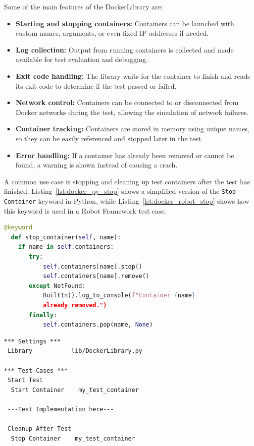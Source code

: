 \vspace{0.5em}
Some of the main features of the DockerLibrary are:

\begin{itemize}
	\item \textbf{Starting and stopping containers:} Containers can be launched with custom names, arguments, or even fixed IP addresses if needed.
	\item \textbf{Log collection:} Output from running containers is collected and made available for test evaluation and debugging.
	\item \textbf{Exit code handling:} The library waits for the container to finish and reads its exit code to determine if the test passed or failed.
	\item \textbf{Network control:} Containers can be connected to or disconnected from Docker networks during the test, allowing the simulation of network failures.
	\item \textbf{Container tracking:} Containers are stored in memory using unique names, so they can be easily referenced and stopped later in the test.
	\item \textbf{Error handling:} If a container has already been removed or cannot be found, a warning is shown instead of causing a crash.
\end{itemize}

\vspace{0.5em}
A common use case is stopping and cleaning up test containers after the test has finished. Listing~\ref{lst:docker_py_stop} shows a simplified version of the \texttt{Stop Container} keyword in Python, while Listing~\ref{lst:docker_robot_stop} shows how this keyword is used in a Robot Framework test case.


\begin{lstlisting}[style=cppstyle, language=Python, caption={Example keyword implementation in \texttt{DockerLibrary.py}}, label={lst:docker_py_stop}, captionpos=b]
 @keyword
  def stop_container(self, name):
    if name in self.containers:
       try:
           self.containers[name].stop()
           self.containers[name].remove()
       except NotFound:
           BuiltIn().log_to_console(f"Container {name} 
           already removed.")
       finally:
           self.containers.pop(name, None)
\end{lstlisting}

\clearpage
\begin{lstlisting}[style=cppstyle, caption={Calling \texttt{Stop Container} in a Robot Framework test}, label={lst:docker_robot_stop}, captionpos=b]
*** Settings ***
 Library           lib/DockerLibrary.py	

*** Test Cases ***
 Start Test
  Start Container    my_test_container
  
 ---Test Implementation here---  
 
 Cleanup After Test
  Stop Container    my_test_container
\end{lstlisting}


